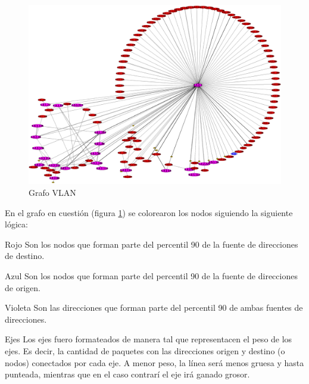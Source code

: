     \begin{figure}[!t]
        \centering
        \includegraphics[width=\textwidth]{img/graph/escenario_1/vlan10/vlan10_500toEnd}
        \caption{Grafo VLAN }
        \label{fig:vlan10_grafo}
    \end{figure}

    \par En el grafo en cuesti\'on (figura \ref{fig:vlan10_grafo}) se colorearon los nodos
    siguiendo la siguiente l\'ogica:

    \begin{LaTeXdescription}
        \item[Rojo] Son los nodos que forman parte del percentil 90 de la fuente de
        direcciones de destino.\\

        \item[Azul] Son los nodos que forman parte del percentil 90 de la fuente de 
        direcciones de origen.\\

        \item[Violeta] Son las direcciones que forman parte del percentil 90 de ambas
        fuentes de direcciones.\\

    \item[Ejes] Los ejes fuero formateados de manera tal que representacen el peso de los
        ejes. Es decir, la cantidad de paquetes con las direcciones origen y destino (o nodos)
        conectados por cada eje. A menor peso, la l\'inea ser\'a menos gruesa y hasta
        punteada, mientras que en el caso contrar\'i el eje ir\'a ganado grosor.\\

    \end{LaTeXdescription}

